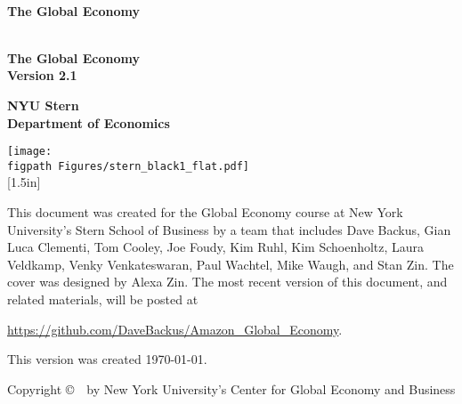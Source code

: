 \begin{titlepage}

\begin{center}
\textsc{}\\[1.5in]
{\Huge\bf\sffamily The Global Economy} \\ [0.5in]
\end{center}

\pagebreak
\phantom{x}
\thispagestyle{empty}

\pagebreak
\thispagestyle{empty}
\begin{center}
\textsc{}\\[1.5in]
{\Huge\bf\sffamily The Global Economy} \\ [0.25in]
{\huge\bf\sffamily Version 2.1}

\vspace*{1.00in}
{\huge\bf\sffamily NYU Stern}\\[1ex]
{\huge\bf\sffamily Department of  Economics}


\vfill
{\texttt{[image: \\figpath Figures/stern\_black1\_flat.pdf]}\\
[1.5in]
}
\end{center}


\newpage
\thispagestyle{empty}
\phantom{x}
\vfill
This document was created for the Global Economy course at New York
University's Stern School of Business by a team that includes
Dave Backus, Gian Luca Clementi, Tom Cooley, Joe Foudy, Kim Ruhl,
Kim Schoenholtz, Laura Veldkamp, Venky Venkateswaran, Paul Wachtel, Mike Waugh,
and Stan Zin.
The cover was designed by Alexa Zin.
The most recent version of this document, and related materials,
will be posted at

\vspace*{\parskip}
\centerline{\url{https://github.com/DaveBackus/Amazon_Global_Economy}.}

This version was created \today.

Copyright \copyright \ \number\year \ by New York University's Center for Global Economy and Business


\end{titlepage}
